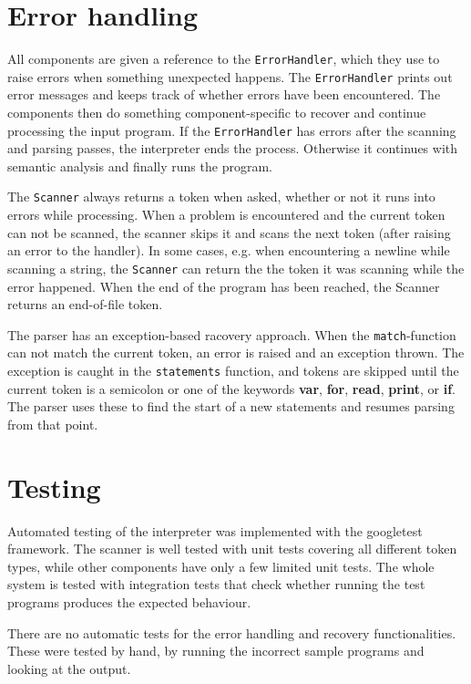 \documentclass[a4paper]{article}
\newcommand*{\code}[1]{\lstinline{#1}}
\begin{document}
\section{Error handling}

All components are given a reference to the \code{ErrorHandler}, 
which they use to raise errors when something unexpected happens.
The \code{ErrorHandler} prints out error messages and keeps track 
of whether errors have been encountered. 
The components then do something component-specific to recover and 
continue processing the input program. If the \code{ErrorHandler} 
has errors after the scanning and parsing passes, the interpreter 
ends the process. Otherwise it continues with semantic analysis 
and finally runs the program.

The \code{Scanner} always returns a token when asked, whether or 
not it runs into errors while processing. When a problem is 
encountered and the current token can not be scanned, the scanner 
skips it and scans the next token (after raising an error to the 
handler). In some cases, e.g. when encountering a newline while 
scanning a string, the \code{Scanner} can return the the token it 
was scanning while the error happened. When the end of the 
program has been reached, the Scanner returns an end-of-file token.

The parser has an exception-based racovery approach. When the 
\code{match}-function can not match the current token, an error 
is raised and an exception thrown. The exception is caught 
in the \code{statements} function, and tokens are skipped until
the current token is a semicolon or one of the keywords 
\textbf{var}, \textbf{for}, \textbf{read}, \textbf{print}, 
or \textbf{if}. The parser uses these to find the start of a 
new statements and resumes parsing from that point.

\section{Testing}

Automated testing of the interpreter was implemented with the 
googletest framework. The scanner is well tested with unit tests 
covering all different token types, while other components have 
only a few limited unit tests. The whole system is tested with 
integration tests that check whether running the test programs 
produces the expected behaviour. 

There are no automatic tests for the error handling and recovery 
functionalities. These were tested by hand, by running the incorrect 
sample programs and looking at the output.
\end{document}
